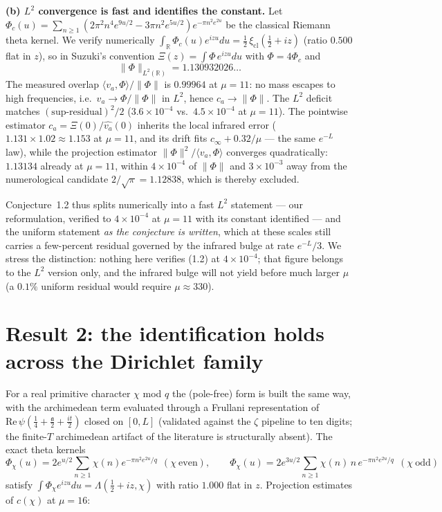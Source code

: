 \documentclass[10pt]{article}
\newcommand{\R}{\mathbb{R}}
\newcommand{\norm}[1]{\lVert #1\rVert}
\begin{document}
\medskip
\noindent\textbf{(b) $L^2$ convergence is fast and identifies the constant.}
Let $\Phi_c(u)=\sum_{n\ge1}(2\pi^2n^4e^{9u/2}-3\pi n^2e^{5u/2})
e^{-\pi n^2e^{2u}}$ be the classical Riemann theta kernel. We verify
numerically $\int_\R \Phi_c(u)e^{izu}du=\tfrac12\,\xi_{\mathrm{cl}}
(\tfrac12+iz)$ (ratio $0.500$ flat in $z$), so in Suzuki's convention
$\Xi(z)=\int\Phi\,e^{izu}du$ with $\Phi=4\Phi_c$ and
\[
\norm{\Phi}_{L^2(\R)}=1.130932026\ldots
\]
The measured overlap $\langle v_a,\Phi\rangle/\norm{\Phi}$ is
$0.99964$ at $\mu=11$: no mass escapes to high frequencies, i.e.\
$v_a\to\Phi/\norm{\Phi}$ in $L^2$, hence $c_a\to\norm{\Phi}$. The
$L^2$ deficit matches $(\text{sup-residual})^2/2$
($3.6\times10^{-4}$ vs.\ $4.5\times10^{-4}$ at $\mu=11$). The
pointwise estimator $c_a=\Xi(0)/\widehat{v_a}(0)$ inherits the local
infrared error ($1.131\times1.02\approx1.153$ at $\mu=11$, and its
drift fits $c_\infty+0.32/\mu$ --- the same $e^{-L}$ law), while the
projection estimator $\norm{\Phi}^2/\langle v_a,\Phi\rangle$ converges
quadratically: $1.13134$ already at $\mu=11$, within $4\times10^{-4}$
of $\norm{\Phi}$ and $3\times10^{-3}$ away from the numerological
candidate $2/\sqrt{\pi}=1.12838$, which is thereby excluded.

\medskip
Conjecture~1.2 thus splits numerically into a fast $L^2$ statement ---
our reformulation, verified to $4\times10^{-4}$ at $\mu=11$ with its
constant identified --- and the uniform statement \emph{as the
conjecture is written}, which at these scales still carries a
few-percent residual governed by the infrared bulge at rate $e^{-L}/3$.
We stress the distinction: nothing here verifies (1.2) at
$4\times10^{-4}$; that figure belongs to the $L^2$ version only, and
the infrared bulge will not yield before much larger $\mu$ (a $0.1\%$
uniform residual would require $\mu\approx330$).

\section{Result 2: the identification holds across the Dirichlet family}

For a real primitive character $\chi$ mod $q$ the (pole-free) form is
built the same way, with the archimedean term evaluated through a
Frullani representation of $\mathrm{Re}\,\psi(\tfrac14+\tfrac{\mathfrak a}2
+\tfrac{it}2)$ closed on $[0,L]$ (validated against the $\zeta$
pipeline to ten digits; the finite-$T$ archimedean artifact of the
literature is structurally absent). The exact theta kernels
\[
\Phi_\chi(u)=2e^{u/2}\!\!\sum_{n\ge1}\chi(n)e^{-\pi n^2e^{2u}/q}
\ \ (\chi\ \text{even}),\qquad
\Phi_\chi(u)=2e^{3u/2}\!\!\sum_{n\ge1}\chi(n)\,n\,e^{-\pi n^2e^{2u}/q}
\ \ (\chi\ \text{odd})
\]
satisfy $\int\Phi_\chi e^{izu}du=\Lambda(\tfrac12+iz,\chi)$ with ratio
$1.000$ flat in $z$. Projection estimates of $c(\chi)$ at $\mu=16$:
\end{document}

